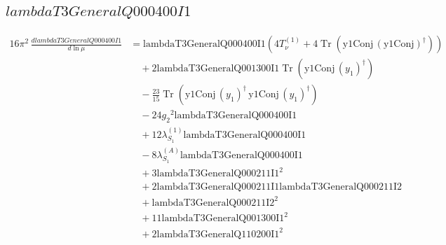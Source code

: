 \documentclass[10pt,a4paper]{article}
\begin{document}
\subsection*{$lambdaT3GeneralQ000400I1$}
\begin{align*}
16\pi^2\,\frac{d lambdaT3GeneralQ000400I1}{d\ln\mu} &=\text{lambdaT3GeneralQ000400I1} (4 T_{\nu}^{(1)}+4 \operatorname{Tr}\!\left(\text{y1Conj}\,\left(\text{y1Conj}\right)^{\dagger}\right)) \\
&\quad +2 \text{lambdaT3GeneralQ001300I1} \operatorname{Tr}\!\left(\text{y1Conj}\,\left({y_1}\right)^{\dagger}\right) \\
&\quad -\frac{23}{15} \operatorname{Tr}\!\left(\text{y1Conj}\,\left({y_1}\right)^{\dagger}\,\text{y1Conj}\,\left({y_1}\right)^{\dagger}\right) \\
&\quad -24 {g_2}^2 \text{lambdaT3GeneralQ000400I1} \\
&\quad +12 {\lambda_{S_1}^{(1)}} \text{lambdaT3GeneralQ000400I1} \\
&\quad -8 {\lambda_{S_1}^{(A)}} \text{lambdaT3GeneralQ000400I1} \\
&\quad +3 \text{lambdaT3GeneralQ000211I1}^2 \\
&\quad +2 \text{lambdaT3GeneralQ000211I1} \text{lambdaT3GeneralQ000211I2} \\
&\quad +\text{lambdaT3GeneralQ000211I2}^2 \\
&\quad +11 \text{lambdaT3GeneralQ001300I1}^2 \\
&\quad +2 \text{lambdaT3GeneralQ110200I1}^2 \\
\end{align*}
\end{document}
